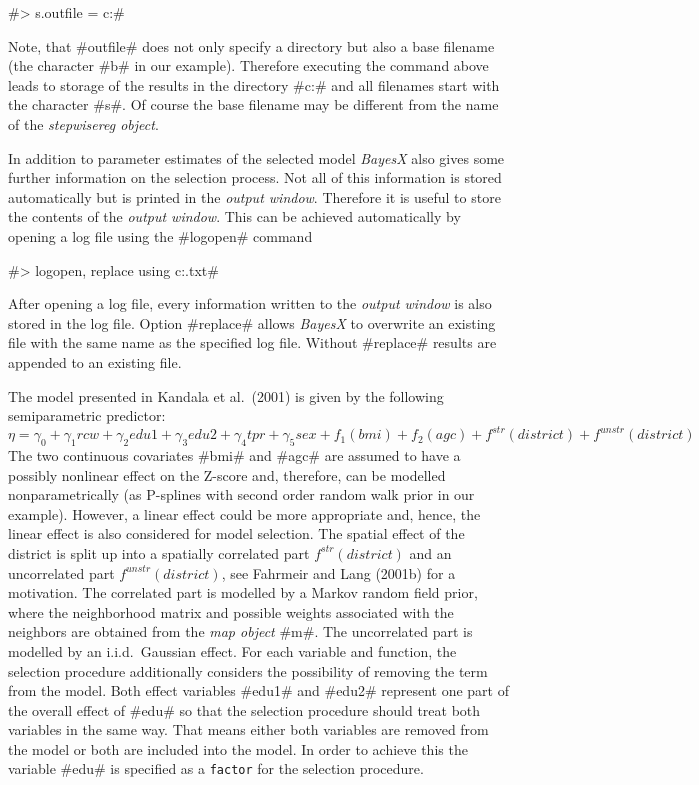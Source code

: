 \documentclass[11pt,a4paper,twoside]{bayesxreport}
\begin{document}
#> s.outfile = c:\data\s#

Note, that #outfile# does not only specify a directory but also a
base filename (the character #b# in our example). Therefore
executing the command above leads to storage of the results in the
directory #c:\data# and all filenames start with the character #s#.
Of course the base filename may be different from the name of the
{\it stepwisereg object}.

In addition to parameter estimates of the selected model {\it
BayesX} also gives some further information on the selection
process. Not all of this information is stored automatically but is
printed in the {\it output window}. Therefore it is useful to store
the contents of the {\it output window}. This can be achieved
automatically by opening a log file using the #logopen# command

#> logopen, replace using c:\data\logstep.txt#

After opening a log file, every information written to the {\em
output window} is also stored in the log file. Option #replace#
allows {\it BayesX} to overwrite an existing file with the same name
as the specified log file. Without #replace# results are appended to
an existing file.

The model presented in Kandala et al.~(2001) is given by the
following semiparametric predictor:
\[\eta=\gamma_0+\gamma_1rcw+\gamma_2edu1+\gamma_3edu2+\gamma_4tpr+\gamma_5sex+f_1(bmi)+f_2(agc)+f^{str}(district)+f^{unstr}(district)\]
The two continuous covariates #bmi# and #agc# are assumed to have a
possibly nonlinear effect on the Z-score and, therefore, can be
modelled nonparametrically (as P-splines with second order random
walk prior in our example). However, a linear effect could be more
appropriate and, hence, the linear effect is also considered for
model selection. The spatial effect of the district is split up into
a spatially correlated part $f^{str}(district)$ and an uncorrelated
part $f^{unstr}(district)$, see Fahrmeir and Lang (2001b) for a
motivation. The correlated part is modelled by a Markov random field
prior, where the neighborhood matrix and possible weights associated
with the neighbors are obtained from the {\it map object} #m#. The
uncorrelated part is modelled by an i.i.d.~Gaussian effect. For each
variable and function, the selection procedure additionally
considers the possibility of removing the term from the model. Both
effect variables #edu1# and #edu2# represent one part of the overall
effect of #edu# so that the selection procedure should treat both
variables in the same way. That means either both variables are
removed from the model or both are included into the model. In order
to achieve this the variable #edu# is specified as a {\tt factor}
for the selection procedure.
\end{document}
